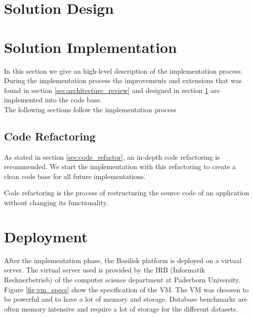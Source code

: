 \section{Solution Design}
\label{sec:solution_design}




\section{Solution Implementation}
\label{sec:solution_implementation}


In this section we give an high-level description of the implementation process.
During the implementation process the improvements and extensions that was found in section \ref{sec:architecture_review} and designed in section \ref{sec:solution_design} are implemented into the code base.
\\

The following sections follow the implementation process



\subsection{Code Refactoring}
\label{sec:impl_code_refactor}
As stated in section \ref{sec:code_refactor}, an in-depth code refactoring is recommended.
We start the implementation with this refactoring to create a clean code base for all future implementations.

Code refactoring is the process of restructuring the source code of an application without changing its functionality\cite{fowlerRefactoringImprovingDesign2019a}.




\section{Deployment}
\label{sec:deployment}
After the implementation phase, the Basilisk platform is deployed on a virtual server.
The virtual server used is provided by the IRB (Informatik Rechnerbetrieb) of the computer science department at Paderborn University.
Figure \ref{fig:vm_specs} show the specification of the VM.
The VM was choosen to be powerful and to have a lot of memory and storage.
Database benchmarks are often memory intensive and require a lot of storage for the different datasets.


